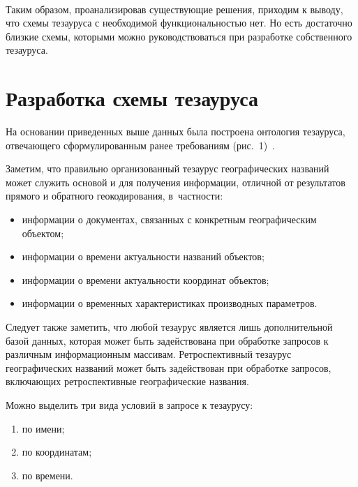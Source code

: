\begin{multicols}{2}
  \begin{figure*}[b]
  \vspace*{1pt}
 \begin{center}
 \mbox{%
 \epsfxsize=115.191mm
 }
 \end{center}
 \vspace*{-9pt}
   \end{figure*}
  
  Таким образом, проанализировав сущест\-ву\-ющие решения, приходим к выводу, что схемы 
тезауруса с необходимой функциональностью нет. Но есть достаточно близкие схемы, 
которыми можно руководствоваться при разработке собственного тезауруса. 
  
  \section{Разработка схемы тезауруса}
  
  На основании приведенных выше данных была построена онтология тезауруса, 
отвечающего сформулированным ранее требованиям (рис.~1)~\cite{13-sk}.
  

  
  Заметим, что правильно организованный тезаурус географических названий может 
служить основой и для получения информации, отличной от результатов прямого и 
обратного геокодирования, в~част\-ности:
  \begin{itemize}
\item информации о документах, связанных с конкретным географическим объектом;
\item информации о времени актуальности названий объектов;
\item информации о времени актуальности координат объектов;
\item информации о временных характеристиках производных параметров.
\end{itemize}

  Следует также заметить, что любой тезаурус является лишь дополнительной базой 
данных, которая может быть задействована при обработке запросов к различным 
информационным массивам. Ретроспективный тезаурус географических названий может 
быть задействован при обработке запросов, включающих ретроспективные географические 
названия.
  
  Можно выделить три вида условий в запросе к тезаурусу:
  \begin{enumerate}[(1)]
\item по имени;
\item по координатам;
\item по времени.
\end{enumerate}


\end{multicols}

